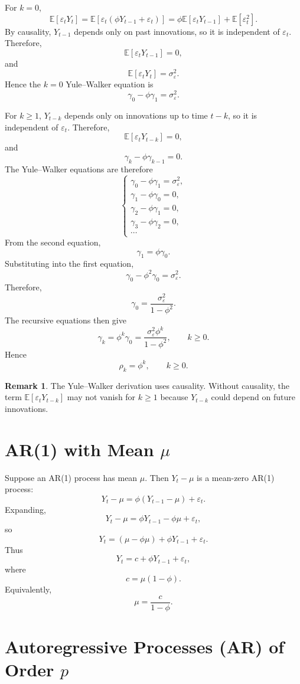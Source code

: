 \documentclass[12pt,oneside]{book}
\numberwithin{equation}{section}
\theoremstyle{definition}
\newtheorem{remark}{Remark}[section]
\theoremstyle{plain}
\theoremstyle{remark}
\newcommand{\E}{\mathbb{E}}
\begin{document}
For $k=0$,
\[
\E[\varepsilon_tY_t]
=
\E[\varepsilon_t(\phi Y_{t-1}+\varepsilon_t)]
=
\phi\E[\varepsilon_tY_{t-1}]+\E[\varepsilon_t^2].
\]
By causality, $Y_{t-1}$ depends only on past innovations, so it is independent of $\varepsilon_t$. Therefore,
\[
\E[\varepsilon_tY_{t-1}]=0,
\]
and
\[
\E[\varepsilon_tY_t]=\sigma_\varepsilon^2.
\]
Hence the $k=0$ Yule--Walker equation is
\[
\gamma_0-\phi\gamma_1=\sigma_\varepsilon^2.
\]

For $k\geq 1$, $Y_{t-k}$ depends only on innovations up to time $t-k$, so it is independent of $\varepsilon_t$. Therefore,
\[
\E[\varepsilon_tY_{t-k}]=0,
\]
and
\[
\gamma_k-\phi\gamma_{k-1}=0.
\]
The Yule--Walker equations are therefore
\[
\begin{cases}
\gamma_0-\phi\gamma_1=\sigma_\varepsilon^2, \\
\gamma_1-\phi\gamma_0=0, \\
\gamma_2-\phi\gamma_1=0, \\
\gamma_3-\phi\gamma_2=0, \\
\cdots
\end{cases}
\]
From the second equation,
\[
\gamma_1=\phi\gamma_0.
\]
Substituting into the first equation,
\[
\gamma_0-\phi^2\gamma_0=\sigma_\varepsilon^2.
\]
Therefore,
\[
\gamma_0=\frac{\sigma_\varepsilon^2}{1-\phi^2}.
\]
The recursive equations then give
\[
\gamma_k=\phi^k\gamma_0
=
\frac{\sigma_\varepsilon^2\phi^k}{1-\phi^2},
\qquad k\geq 0.
\]
Hence
\[
\rho_k=\phi^k,
\qquad k\geq 0.
\]

\begin{remark}
The Yule--Walker derivation uses causality. Without causality, the term $\E[\varepsilon_tY_{t-k}]$ may not vanish for $k\geq 1$ because $Y_{t-k}$ could depend on future innovations.
\end{remark}

\section*{AR(1) with Mean $\mu$}

Suppose an AR(1) process has mean $\mu$. Then $Y_t-\mu$ is a mean-zero AR(1) process:
\[
Y_t-\mu=\phi(Y_{t-1}-\mu)+\varepsilon_t.
\]
Expanding,
\[
Y_t-\mu=\phi Y_{t-1}-\phi\mu+\varepsilon_t,
\]
so
\[
Y_t=(\mu-\phi\mu)+\phi Y_{t-1}+\varepsilon_t.
\]
Thus
\[
Y_t=c+\phi Y_{t-1}+\varepsilon_t,
\]
where
\[
c=\mu(1-\phi).
\]
Equivalently,
\[
\mu=\frac{c}{1-\phi}.
\]

\section{Autoregressive Processes (AR) of Order $p$}
\end{document}
